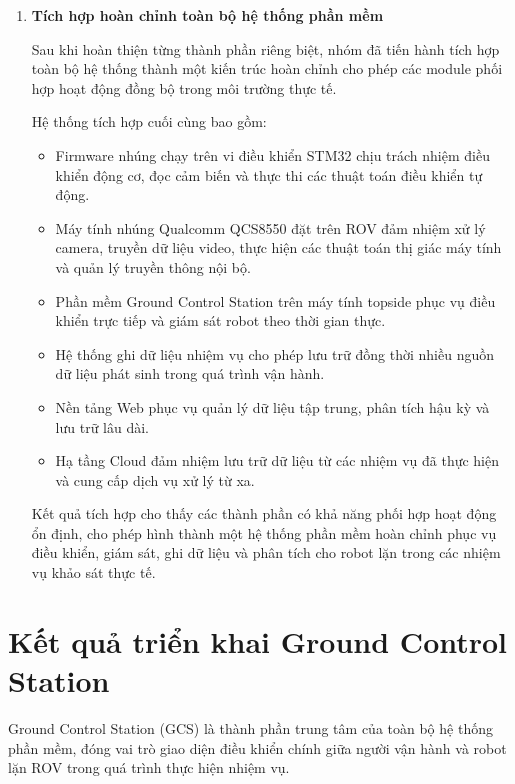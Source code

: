 \documentclass[../DoAn.tex]{subfiles}
\begin{document}
\begin{enumerate}
\item \textbf{Tích hợp hoàn chỉnh toàn bộ hệ thống phần mềm}

Sau khi hoàn thiện từng thành phần riêng biệt, nhóm đã tiến hành tích hợp toàn bộ hệ thống thành một kiến trúc hoàn chỉnh cho phép các module phối hợp hoạt động đồng bộ trong môi trường thực tế.

Hệ thống tích hợp cuối cùng bao gồm:

\begin{itemize}
    \item Firmware nhúng chạy trên vi điều khiển STM32 chịu trách nhiệm điều khiển động cơ, đọc cảm biến và thực thi các thuật toán điều khiển tự động.
    
    \item Máy tính nhúng Qualcomm QCS8550 đặt trên ROV đảm nhiệm xử lý camera, truyền dữ liệu video, thực hiện các thuật toán thị giác máy tính và quản lý truyền thông nội bộ.
    
    \item Phần mềm Ground Control Station trên máy tính topside phục vụ điều khiển trực tiếp và giám sát robot theo thời gian thực.
    
    \item Hệ thống ghi dữ liệu nhiệm vụ cho phép lưu trữ đồng thời nhiều nguồn dữ liệu phát sinh trong quá trình vận hành.
    
    \item Nền tảng Web phục vụ quản lý dữ liệu tập trung, phân tích hậu kỳ và lưu trữ lâu dài.
    
    \item Hạ tầng Cloud đảm nhiệm lưu trữ dữ liệu từ các nhiệm vụ đã thực hiện và cung cấp dịch vụ xử lý từ xa.
\end{itemize}

Kết quả tích hợp cho thấy các thành phần có khả năng phối hợp hoạt động ổn định, cho phép hình thành một hệ thống phần mềm hoàn chỉnh phục vụ điều khiển, giám sát, ghi dữ liệu và phân tích cho robot lặn trong các nhiệm vụ khảo sát thực tế.

\end{enumerate}

\section{Kết quả triển khai Ground Control Station}

Ground Control Station (GCS) là thành phần trung tâm của toàn bộ hệ thống phần mềm, đóng vai trò giao diện điều khiển chính giữa người vận hành và robot lặn ROV trong quá trình thực hiện nhiệm vụ.
\end{document}
